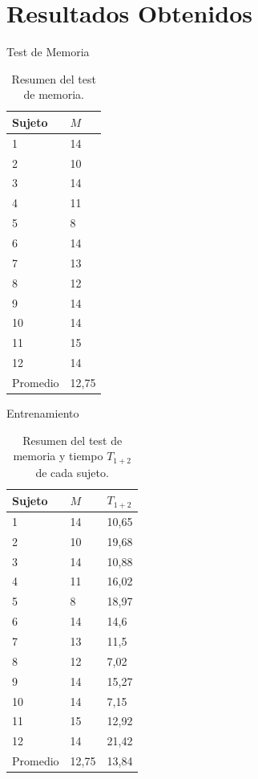 \section{Resultados Obtenidos}

\begin{frame}{Test de Memoria}
\begin{table}[H]
\centering
\footnotesize
\begin{tabular}{|p{1.6cm}|p{1.6cm}|}
\hline
    Sujeto & $M$ \\
    \hline 
    1 & 14 \\
    2 & 10 \\
    3 & 14 \\
    4 & 11 \\
    5 & 8 \\
    6 & 14 \\
    7 & 13 \\
    8 & 12 \\
    9 & 14 \\
    10 & 14 \\
    11 & 15 \\
    12 & 14 \\
\hline
Promedio &  12,75 \\
\hline
\end{tabular}
\caption{Resumen del test de memoria.}
\label{sec:tabla-memoria}
\end{table}
\end{frame}

\begin{frame}{Entrenamiento}
\begin{table}[H]
\centering
\footnotesize
\begin{tabular}{|p{1.6cm}|p{1.6cm}|p{1.6cm}|}
\hline
    Sujeto & $M$ & $T_{1+2}$ \\
    \hline 
    1 & 14 & 10,65 \\
    2 & 10 & 19,68 \\
    3 & 14 & 10,88 \\
    4 & 11 & 16,02 \\
    5 & 8 & 18,97 \\
    6 & 14 & 14,6 \\
    7 & 13 & 11,5 \\
    8 & 12 & 7,02 \\
    9 & 14 & 15,27 \\
    10 & 14 & 7,15 \\
    11 & 15 & 12,92 \\
    12 & 14 & 21,42 \\
\hline
    Promedio &  12,75 & 13,84  \\
\hline
\end{tabular}
\caption{Resumen del test de memoria y tiempo $T_{1+2}$ de cada sujeto.}
\label{sec:tabla-t1-memoria}
\end{table}
\end{frame}


